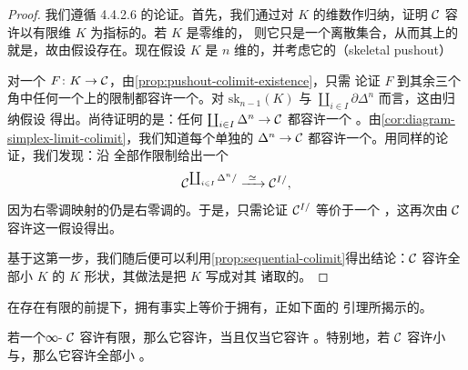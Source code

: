 \begin{proof}
我们遵循 \cite{Lur09} 4.4.2.6 的论证。首先，我们通过对 $K$ 的维数作归纳，证明
$\mathcal{C}$ 容许以有限维\trSimplicialSets{} $K$ 为指标的\trColimit{}。若 $K$ 是零维的，
则它只是一个离散集合，从而其上的\trColimit{}就是\trCoproduct{}，故由假设存在。现在假设 $K$
是 $n$ 维的，并考虑它的\trSkeleton{}\trPushout{}（skeletal pushout）
\begin{center}
\end{center}
对一个\trFunctor{} $F\colon K \to \mathcal{C}$，由\cref{prop:pushout-colimit-existence}，只需
论证 $F$ 到其余三个角中任何一个上的限制都容许一个\trColimit{}。对
$\mathrm{sk}_{n-1}(K)$ 与 $\coprod_{i \in I} \partial\Delta^n$ 而言，这由归纳假设
得出。尚待证明的是：任何\trFunctor{} $\coprod_{i \in I} \Delta^n \to \mathcal{C}$ 都容许一个%
\trColimit{}。由\cref{cor:diagram-simplex-limit-colimit}，我们知道每个单独的%
\trFunctor{} $\Delta^n \to \mathcal{C}$ 都容许一个\trColimit{}。用同样的论证，我们发现：沿
全部\trTerminalObject{}作限制给出一个\trJoyalEquivalence{}%
\[
\C^{\coprod_{i \in I} \Delta^n/} \xrightarrow{\ \simeq\ } \C^{I/},
\]
因为右零调映射的\trCoproduct{}仍是右零调的。于是，只需论证 $\mathcal{C}^{I/}$ 等价于一个%
\trRepresentable{}\trLeftFibration{}，这再次由 $\mathcal{C}$ 容许\trCoproduct{}这一假设得出。

基于这第一步，我们随后便可以利用\cref{prop:sequential-colimit}得出结论：$\mathcal{C}$
容许全部小\trSimplicialSets{} $K$ 的 $K$ 形状\trColimit{}，其做法是把 $K$ 写成对其
诸\trSkeleton{}取的\trColimit{}。
\end{proof}

在存在有限\trCoproduct{}的前提下，拥有\trPushout{}事实上等价于拥有\trCoequalizer{}，正如下面的
引理所揭示的。

\begin{lemma}\label{lem:pushouts-coequalizers}
若一个∞-\trCategory{} $\mathcal{C}$ 容许有限\trCoproduct{}，那么它容许\trPushout{}，当且仅当它容许%
\trCoequalizer{}。特别地，若 $\mathcal{C}$ 容许小\trCoproduct{}与\trCoequalizer{}，那么它容许全部小%
\trColimit{}。
\end{lemma}

